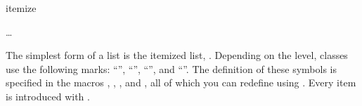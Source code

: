   \begin{Declaration}
    \begin{Environment}{itemize}
      \begin{Body}
         \dots
        \BodyDots
      \end{Body}
    \end{Environment}
  \end{Declaration}%
  The simplest form of a list is the itemized list,
  . %
  \iffalse %
  The users of a certain disliked word processing package often refer to this
  form of a list as \emph{bullet points}. Presumably, they cannot imagine
  that, depending on the level, a symbol other than a large dot could be used
  to introduce each point. %
  \fi%
  Depending on the level, \KOMAScript{} classes use the following marks:
  ``{}'', ``{}'', ``{}'', and
  ``{}''. The definition of these symbols is specified in
  the macros , ,
  , and , all of which you can
  redefine using . Every item is introduced with
  .%
